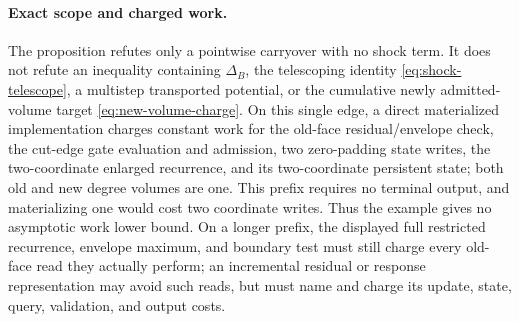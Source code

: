 \paragraph{Exact scope and charged work.}
The proposition refutes only a pointwise carryover with no shock term.  It
does not refute an inequality containing $\Delta_B$, the telescoping identity
\cref{eq:shock-telescope}, a multistep transported potential, or the
cumulative newly admitted-volume target \cref{eq:new-volume-charge}.  On this
single edge, a direct materialized implementation charges constant work for
the old-face residual/envelope check, the cut-edge gate evaluation and
admission, two zero-padding state writes, the two-coordinate enlarged
recurrence, and its two-coordinate persistent state; both old and new degree
volumes are one.  This prefix requires no terminal output, and materializing
one would cost two coordinate writes.  Thus the example gives no asymptotic
work lower bound.  On a longer prefix,
the displayed full restricted recurrence, envelope maximum, and boundary
test must still charge every old-face read they actually perform; an
incremental residual or response representation may avoid such reads, but
must name and charge its update, state, query, validation, and output costs.
